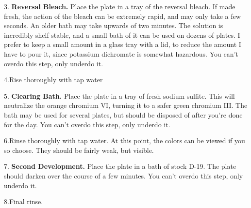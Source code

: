 \documentclass[11pt]{article}
\begin{document}
3. \textbf{Reversal Bleach.} Place the plate in a tray of the reversal bleach. If made fresh, the action of the bleach can be extremely rapid, and may only take a few seconds. An older bath may take upwards of two minutes. The solution is incredibly shelf stable, and a small bath of it can be used on dozens of plates. I prefer to keep a small amount in a glass tray with a lid, to reduce the amount I have to pour it, since potassium dichromate is somewhat hazardous. You can't overdo this step, only underdo it.\newline

4.Rise thoroughly with tap water\newline

5. \textbf{Clearing Bath.} Place the plate in a tray of fresh sodium sulfite. This will neutralize the orange chromium VI, turning it to a safer green chromium III. The bath may be used for several plates, but should be disposed of after you're done for the day. You can't overdo this step, only underdo it.\newline

6.Rinse thoroughly with tap water. At this point, the colors can be viewed if you so choose. They should be fairly weak, but visible.\newline

7. \textbf{Second Development.} Place the plate in a bath of stock D-19. The plate should darken over the course of a few minutes. You can't overdo this step, only underdo it.\newline

8.Final rinse.\newline
\end{document}
